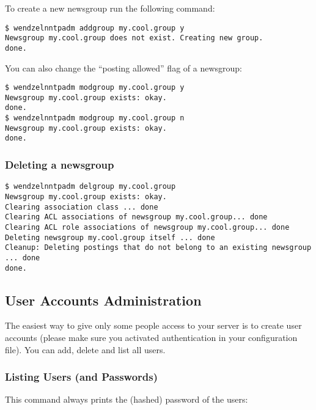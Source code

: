 \documentclass[12pt,fleqn,leqno]{scrbook}
\begin{document}
To create a new newsgroup run the following command:

\begin{verbatim}
$ wendzelnntpadm addgroup my.cool.group y
Newsgroup my.cool.group does not exist. Creating new group.
done.
\end{verbatim}

You can also change the ``posting allowed'' flag of a newsgroup:

\begin{verbatim}
$ wendzelnntpadm modgroup my.cool.group y
Newsgroup my.cool.group exists: okay.
done.
$ wendzelnntpadm modgroup my.cool.group n
Newsgroup my.cool.group exists: okay.
done.
\end{verbatim}

\hypertarget{deleting-a-newsgroup}{%
\subsubsection{Deleting a newsgroup}\label{deleting-a-newsgroup}}

\begin{verbatim}
$ wendzelnntpadm delgroup my.cool.group
Newsgroup my.cool.group exists: okay.
Clearing association class ... done
Clearing ACL associations of newsgroup my.cool.group... done
Clearing ACL role associations of newsgroup my.cool.group... done
Deleting newsgroup my.cool.group itself ... done
Cleanup: Deleting postings that do not belong to an existing newsgroup ... done
done.
\end{verbatim}

\hypertarget{user-accounts-administration}{%
\subsection{User Accounts
Administration}\label{user-accounts-administration}}

The easiest way to give only some people access to your server is to
create user accounts (please make sure you activated authentication in
your configuration file). You can add, delete and list all users.

\hypertarget{listing-users-and-passwords}{%
\subsubsection{Listing Users (and
Passwords)}\label{listing-users-and-passwords}}

This command always prints the (hashed) password of the users:
\end{document}
